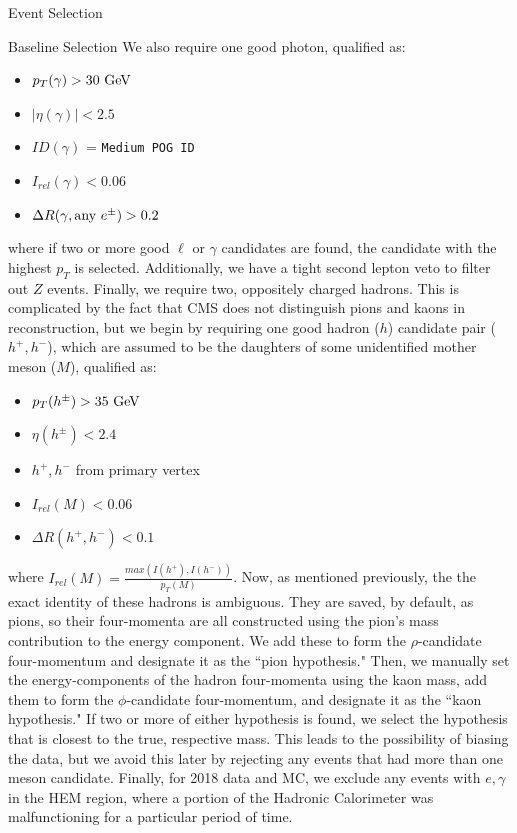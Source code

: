 \begin{section}{Event Selection}
\begin{subsection}{Baseline Selection}
\noindent We also require one good photon, qualified as:
\begin{itemize}
    \item $p_{T}(\gamma) > 30\textnormal{ GeV}$
    \item $|\eta(\gamma)| < 2.5$
    \item $ID(\gamma)$ = \verb|Medium POG ID|
    \item $I_{rel}(\gamma) < 0.06$
    \item $\Delta R(\gamma, \textnormal{any } e^{\pm}) > 0.2$
\end{itemize}
\noindent where if two or more good $\ell$ or $\gamma$ candidates are found, the candidate with the highest $p_{T}$ is selected. Additionally, we have a tight second lepton veto to filter out $Z$ events. Finally, we require two, oppositely charged hadrons. This is complicated by the fact that CMS does not distinguish pions and kaons in reconstruction, but we begin by requiring one good hadron ($h$) candidate pair ($h^{+}, h^{-}$), which are assumed to be the daughters of some unidentified mother meson ($M$), qualified as:
\begin{itemize}
    \item $p_{T}(h^{\pm}) > 35\textnormal{ GeV}$
    \item $\eta(h^{\pm}) < 2.4$
    \item $h^{+}, h^{-}$ from primary vertex
    \item $I_{rel}(M) < 0.06$
    \item $\Delta R(h^{+}, h^{-}) < 0.1$
\end{itemize}
\noindent where $I_{rel}(M) = \frac{max(I(h^{+}), I(h^{-}))}{p_{T}(M)}$. Now, as mentioned previously, the the exact identity of these hadrons is ambiguous. They are saved, by default, as pions, so their four-momenta are all constructed using the pion's mass contribution to the energy component. We add these to form the $\rho$-candidate four-momentum and designate it as the ``pion hypothesis." Then, we manually set the energy-components of the hadron four-momenta using the kaon mass, add them to form the $\phi$-candidate four-momentum, and designate it as the ``kaon hypothesis." If two or more of either hypothesis is found, we select the hypothesis that is closest to the true, respective mass. This leads to the possibility of biasing the data, but we avoid this later by rejecting any events that had more than one meson candidate. Finally, for 2018 data and MC, we exclude any events with $e, \gamma$ in the HEM region, where a portion of the Hadronic Calorimeter was malfunctioning for a particular period of time.
\end{subsection}
\end{section}

